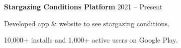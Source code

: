 \begin{entry}
	{{\bf Stargazing Conditions Platform}}
	{2021 -- Present}
	
	Developed app \& website to see stargazing conditions.

	10,000+ installs and 1,000+ active users on Google Play.
\end{entry}
